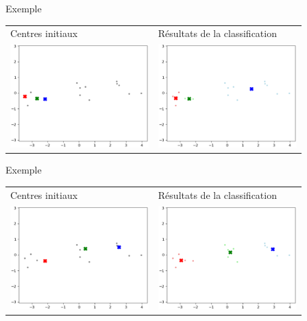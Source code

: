 \documentclass[10pt]{beamer}
\begin{document}
\begin{frame}{\Ctitle}{\stitle}
    \begin{exampleblock}{Exemple}
        \begin{center}
            \begin{tabularx}{\textwidth}{Y|Y}
                Centres initiaux & Résultats de la classification \\
                \includegraphics[height=4cm]{ex1_simple0.eps} & \includegraphics[height=4cm]{ex1_simple6.eps} \\
            \end{tabularx}
        \end{center}
    \end{exampleblock}
\end{frame}

\begin{frame}{\Ctitle}{\stitle}
    \begin{exampleblock}{Exemple}
        \begin{center}
            \begin{tabularx}{\textwidth}{Y|Y}
                Centres initiaux & Résultats de la classification \\
                \includegraphics[height=4cm]{ex2_simple0.eps} & \includegraphics[height=4cm]{ex2_simple4.eps} \\
            \end{tabularx}
        \end{center}
    \end{exampleblock}
\end{frame}
\end{document}
